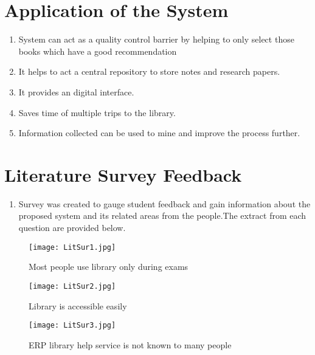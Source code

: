 \documentclass[a4paper,12pt]{report}
\begin{document}
\pagebreak



\section{Application of the System }
\begin{enumerate}
  \item System can act as a quality control barrier by helping to only select those books which have a good recommendation
  \item It helps to act a central repository to store notes and research papers.
  \item It provides an digital interface.
  \item Saves time of multiple trips to the library.
  \item Information collected can be used to mine and improve the process further.
\end{enumerate}

\pagebreak

\section{Literature Survey Feedback}
\begin{enumerate}
  \item Survey was created to gauge student feedback and gain information about the proposed system and its related areas from the people.The extract from each question are provided below. \\
\end{enumerate}


  \begin{figure}[h!]
    \centering
    \texttt{[image: LitSur1.jpg]}
    \caption{Most people use library only during exams}
  \end{figure}

  \begin{figure}[h!]
    \centering
    \texttt{[image: LitSur2.jpg]}
    \caption{Library is accessible easily}
  \end{figure}

  \pagebreak

   \begin{figure}[h!]
    \centering
    \texttt{[image: LitSur3.jpg]}
    \caption{ERP library help service is not known to many people}
  \end{figure}
\end{document}
